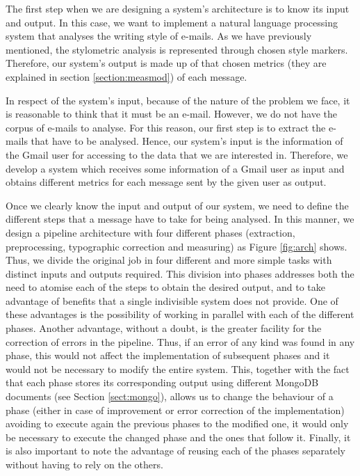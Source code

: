The first step when we are designing a system's architecture is to know its input and output. In this case, we want to implement a natural language processing system that analyses the writing style of e-mails. As we have previously mentioned, the stylometric analysis is represented through chosen style markers. Therefore, our system's output is made up of that chosen metrics (they are explained in section \ref{section:measmod}) of each message.

In respect of the system's input, because of the nature of the problem we face, it is reasonable to think that it must be an e-mail. However, we do not have the corpus of e-mails to analyse. For this reason, our first step is to extract the e-mails that have to be analysed. Hence, our system's input is the information of the Gmail user for accessing to the data that we are interested in. Therefore, we develop a system which receives some information of a Gmail user as input and obtains different metrics for each message sent by the given user as output.

Once we clearly know the input and output of our system, we need to define the different steps that a message have to take for being analysed. In this manner, we design a pipeline architecture with four different phases (extraction, preprocessing, typographic correction and measuring) as Figure \ref{fig:arch} shows. Thus, we divide the original job in four different and more simple tasks with distinct inputs and outputs required. This division into phases addresses both the need to atomise each of the steps to obtain the desired output, and to take advantage of benefits that a single indivisible system does not provide. One of these advantages is the possibility of working in parallel with each of the different phases. Another advantage, without a doubt, is the greater facility for the correction of errors in the pipeline. Thus, if an error of any kind was found in any phase, this would not affect the implementation of subsequent phases and it would not be necessary to modify the entire system. This, together with the fact that each phase stores its corresponding output using different MongoDB documents (see Section \ref{sect:mongo}), allows us to change the behaviour of a phase (either in case of improvement or error correction of the implementation) avoiding to execute again the previous phases to the modified one, it would only be necessary to execute the changed phase and the ones that follow it. Finally, it is also important to note the advantage of reusing each of the phases separately without having to rely on the others.

